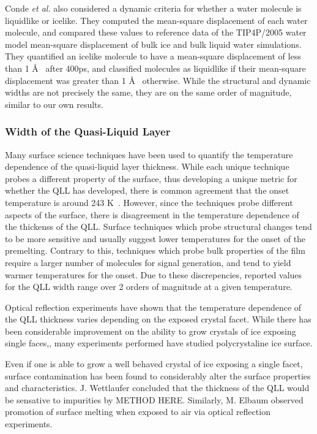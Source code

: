 Conde \textit{et al.} also considered a dynamic criteria for whether a
water molecule is liquidlike or icelike. They computed the mean-square
displacement of each water molecule, and compared these values to
reference data of the TIP4P/2005 water model mean-square displacement
of bulk ice and bulk liquid water simulations. They quantified an
icelike molecule to have a mean-square displacement of less than 1
\AA~ after 400ps, and classified molecules as liquidlike if their
mean-square displacement was greater than 1 \AA~ otherwise. While the
structural and dynamic widths are not precisely the same, they are on
the same order of magnitude, similar to our own results. 


\subsubsection{Width of the Quasi-Liquid Layer}
Many surface science techniques have been used to quantify the
temperature dependence of the quasi-liquid layer
thickness.\cite{Kouchi1987,Golecki1978,Dosch1995,Beaglehole1980, Bluhm1999,
  Bluhm2002, Furukawa1987, Elbaum1993, Dosch1996, Doppenschmidt2000,
  Kaverin2004, Lied1994} While each unique technique probes a different property of
the surface, thus developing a unique metric for whether the QLL has
developed, there is common agreement that the onset temperature is
around 243 K~. However, since the techniques probe different aspects
of the surface, there is disagreement in the temperature dependence of
the thickenss of the QLL. Surface techniques which probe structural
changes tend to be more sensitive and usually suggest lower
temperatures for the onset of the premelting. Contrary to this,
techniques which probe bulk properties of the film require a larger
number of molecules for signal generation, and tend to yield warmer
temperatures for the onset. Due to these discrepencies, reported
values for the QLL width range over 2 orders of magnitude at a given
temperature.\cite{Rosenberg2005,Dosch1996}

Optical reflection experiments have shown that the temperature
dependence of the QLL thickness varies depending on the exposed
crystal facet.\cite{Elbaum1993} While there has been considerable improvement
on the ability to grow crystals of ice exposing single
faces,\cite{Shultz2014, Shultz2017}, many experiments performed have studied
polycrystaline ice surface.

Even if one is able to grow a well behaved crystal of ice exposing a
single facet, surface contamination has been found to considerably
alter the surface properties and characteristics. J. Wettlaufer
concluded that the thickness of the QLL would be sensative to
impurities by METHOD HERE.\cite{Wettlaufer1999} Similarly, M. Elbaum observed
promotion of surface melting when exposed to air via optical
reflection experiments.\cite{Elbaum1993} 



